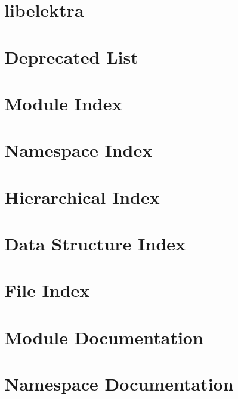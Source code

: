 \documentclass[twoside]{book}
\newcommand{\+}{\discretionary{\mbox{\scriptsize$\hookleftarrow$}}{}{}}
\begin{document}
\chapter{libelektra}
\label{README_md}
\hypertarget{README_md}{}

\chapter{Deprecated List}
\label{deprecated}
\hypertarget{deprecated}{}

\chapter{Module Index}

\chapter{Namespace Index}

\chapter{Hierarchical Index}

\chapter{Data Structure Index}

\chapter{File Index}

\chapter{Module Documentation}











\chapter{Namespace Documentation}


\end{document}
